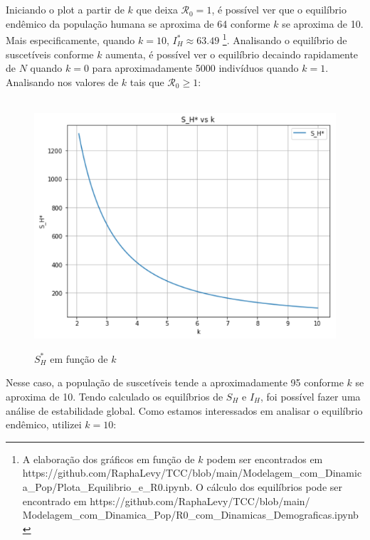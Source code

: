 \documentclass[12pt]{article}
\begin{document}
\\\\
Iniciando o plot a partir de $k$ que deixa $\mathcal{R}_0 = 1$, é possível ver que
o equilíbrio endêmico da população humana se aproxima de 64 conforme $k$ se aproxima de 10.
Mais especificamente, quando $k=10$, $I_H^* \approx 63.49$ \footnote{A elaboração 
dos gráficos em função de $k$ podem ser encontrados em https://github.com/RaphaLevy/TCC/blob/main/Modelagem\_com\_Dinamica\_Pop/Plota\_Equilibrio\_e\_R0.ipynb. 
O cálculo dos equilíbrios pode ser encontrado em
https://github.com/RaphaLevy/TCC/blob/main/\\
Modelagem\_com\_Dinamica\_Pop/R0\_com\_Dinamicas\_Demograficas.ipynb}.
Analisando o equilíbrio de suscetíveis conforme $k$ aumenta, é possível 
ver o equilíbrio decaindo rapidamente
de $N$ quando $k=0$ para aproximadamente 5000 indivíduos quando $k=1$. Analisando 
nos valores de $k$ tais que $\mathcal{R}_0 \geq 1$:
\begin{figure}[!ht]
        \centering
        \hbox{\hspace{4.2em} \includegraphics[scale=0.7] {Plot_S_H_vs_k.png}}
        \caption{$S_H^*$ em função de $k$}
\end{figure} 
\newpage
Nesse caso, a população de suscetíveis tende a aproximadamente 95 conforme 
$k$ se aproxima de 10. Tendo calculado os equilíbrios de $S_H$ e $I_H$,
foi possível fazer uma análise de estabilidade global. Como estamos interessados
em analisar o equilíbrio endêmico, utilizei $k=10$:
\end{document}
